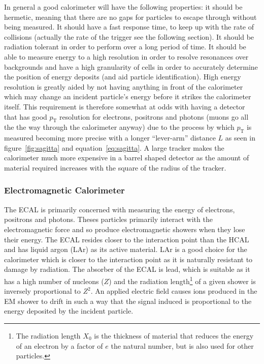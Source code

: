 In general a good calorimeter will have the following properties: it should be
hermetic, meaning that there are no gaps for particles to escape through without
being measured. It should have a fast response time, to keep up with the rate of
collisions (actually the rate of the trigger see the following section). It
should be radiation tolerant in order to perform over a long period of time. It
should be able to measure energy to a high resolution in order to resolve
resonances over backgrounds and have a high granularity of cells in order to
accurately determine the position of energy deposits (and aid particle
identification). High energy resolution is greatly aided by not having anything
in front of the calorimeter which may change an incident particle's energy
before it strikes the calorimeter itself. This requirement is therefore somewhat
at odds with having a detector that has good $p_{\mathrm{T}}$ resolution for
electrons, positrons and photons (muons go all the the way through the
calorimeter anyway) due to the process by which $p_{\mathrm{T}}$ is measured
becoming more precise with a longer ``lever-arm'' distance $L$ as seen in
figure~\ref{fig:sagitta} and equation~\ref{eq:sagitta}. A large tracker makes
the calorimeter much more expensive in a barrel shaped detector as the amount of
material required increases with the square of the radius of the tracker.

\subsubsection{Electromagnetic Calorimeter}
The ECAL is primarily concerned with measuring the energy of electrons,
positrons and photons. Theses particles primarily interact with the
electromagnetic force and so produce electromagnetic showers when they lose
their energy. The ECAL resides closer to the interaction point than the HCAL and
has liquid argon (LAr) as its active material. LAr is a good choice for the
calorimeter which is closer to the interaction point as it is naturally
resistant to damage by radiation. The absorber of the ECAL is lead, which is
suitable as it has a high number of nucleons ($Z$) and the radiation
length\footnote{The radiation length $X_{0}$ is the thickness of material that
reduces the energy of an electron by a factor of $e$ the natural number, but is
also used for other particles.} of a given shower is inversely proportional to
$Z^2$. An applied electric field causes ions produced in the EM shower to drift
in such a way that the signal induced is proportional to the energy deposited by
the incident particle.

